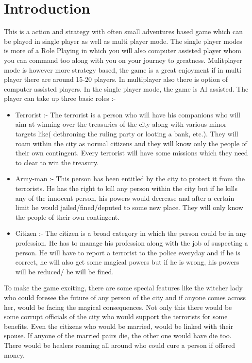 \chapter{Introduction}
This is a action and strategy with often small adventures based game which can be played in single player as well as multi player mode. The single player modes is more of a Role Playing in which you will also computer assisted player whom you can command too along with you on your journey to greatness. Mulitplayer mode is however more strategy based, the game is a great enjoyment if in multi player there are around 15-20 players. In multiplayer also there is option of computer assisted players. In the single player mode, the game is AI assisted. The player can take up three basic roles :-\\
\begin{itemize}
\item Terrorist :- The terrorist is a person who will have his companions who will aim at winning over the treasuries of the city along with various minor targets like( dethroning  the ruling party or looting a bank, etc.). They will roam within the city as normal citizens and they will know only the people of their own contingent. Every terrorist will have some missions which they need to clear to win the treasury.
\item Army-man :- This person has been entitled by the city to protect it from  the terrorists. He has the right to kill any person within the city but if he kills any of the innocent person, his powers would decrease and after a certain limit he would  jailed/fined/deputed to some new place. They will only know the people of their own contingent.
\item Citizen :- The citizen is a broad category in which the person could be in any profession. He has to manage his profession along with the job of suspecting a person. He will have to report a terrorist to the police everyday and if he is correct, he will also get some magical powers but if he is wrong, his powers will be reduced/ he will be fined.
\end{itemize}
To make the game exciting, there are some special features like the witcher lady who could foresee the future of any person of the city and if anyone comes across her, would be facing the magical consequences. Not only this there would be some corrupt officials of the city who would support the terrorists for some benefits. Even the citizens who would be married, would be linked with their spouse. If anyone of the married pairs die, the other one would have die too. There would be healers roaming all around who could cure a person if offered money.